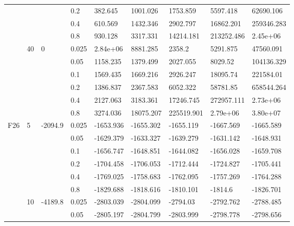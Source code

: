 \begin{longtable}{|l|l|l|l|l|l|l|l|l|}
\cmidrule{4-9} &     &          & 0.2            & 382.645    & 1001.026   & 1753.859   & 5597.418   & 62690.106  \\
\cmidrule{4-9} &     &          & 0.4            & 610.569    & 1432.346   & 2902.797   & 16862.201  & 259346.283 \\
\cmidrule{4-9} &     &          & 0.8            & 930.128    & 3317.331   & 14214.181  & 213252.486 & 2.45e+06   \\
\cmidrule{2-9} & 40  & 0        & 0.025          & 2.84e+06   & 8881.285   & 2358.2     & 5291.875   & 47560.091  \\
\cmidrule{4-9} &     &          & 0.05           & 1158.235   & 1379.499   & 2027.055   & 8029.52    & 104136.329 \\
\cmidrule{4-9} &     &          & 0.1            & 1569.435   & 1669.216   & 2926.247   & 18095.74   & 221584.01  \\
\cmidrule{4-9} &     &          & 0.2            & 1386.837   & 2367.583   & 6052.322   & 58781.85   & 658544.264 \\
\cmidrule{4-9} &     &          & 0.4            & 2127.063   & 3183.361   & 17246.745  & 272957.111 & 2.73e+06   \\
\cmidrule{4-9} &     &          & 0.8            & 3274.036   & 18075.207  & 225519.901 & 2.79e+06   & 3.80e+07   \\ \midrule
F26            & 5   & -2094.9  & 0.025          & -1653.936  & -1655.302  & -1655.119  & -1667.569  & -1665.589  \\
\cmidrule{4-9} &     &          & 0.05           & -1629.379  & -1633.327  & -1639.279  & -1631.142  & -1648.931  \\
\cmidrule{4-9} &     &          & 0.1            & -1656.747  & -1648.851  & -1644.082  & -1656.028  & -1659.708  \\
\cmidrule{4-9} &     &          & 0.2            & -1704.458  & -1706.053  & -1712.444  & -1724.827  & -1705.441  \\
\cmidrule{4-9} &     &          & 0.4            & -1769.025  & -1758.683  & -1762.095  & -1757.269  & -1764.288  \\
\cmidrule{4-9} &     &          & 0.8            & -1829.688  & -1818.616  & -1810.101  & -1814.6    & -1826.701  \\
\cmidrule{2-9} & 10  & -4189.8  & 0.025          & -2803.039  & -2804.099  & -2794.03   & -2792.762  & -2788.485  \\
\cmidrule{4-9} &     &          & 0.05           & -2805.197  & -2804.799  & -2803.999  & -2798.778  & -2798.656  \\

\end{longtable}
